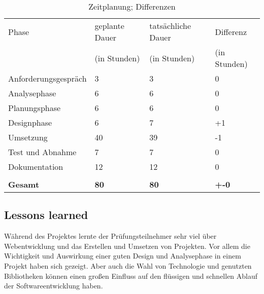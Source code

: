 \documentclass[12pt]{article}
\begin{document}
\begin{table}[H]
    \centering
    \begin{tabular}{|l|l|l|l|}
        \hline
        Phase & geplante Dauer & tatsächliche Dauer & Differenz \\
        & (in Stunden) & (in Stunden) & (in Stunden) \\
        \hline
        Anforderungsgespräch & 3  & 3 &  0 \\
        Analysephase & 6 & 6 &  0 \\
        Planungsphase & 6 & 6 &  0 \\
        Designphase & 6 & 7 & +1 \\
        Umsetzung & 40 & 39 & -1 \\
        Test und Abnahme & 7 & 7 &  0 \\
        Dokumentation & 12 & 12 &  0 \\
        &&& \\
        \hline
        \textbf{Gesamt} & \textbf{80} & \textbf{80} & \textbf{+-0} \\
        \hline
    \end{tabular}
    \caption{Zeitplanung; Differenzen}
    \label{table:timediff}
\end{table}


\subsection{Lessons learned}

Während des Projektes lernte der Prüfungsteilnehmer sehr viel über Webentwicklung und das Erstellen und Umsetzen von Projekten.
Vor allem die Wichtigkeit und Auswirkung einer guten Design und Analysephase in einem Projekt haben sich gezeigt.
Aber auch die Wahl von Technologie und genutzten Bibliotheken können einen großen Einfluss auf den flüssigen und schnellen
Ablauf der Softwareentwicklung haben.
\end{document}
